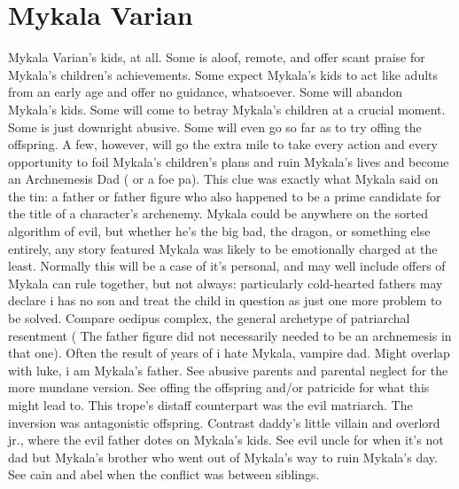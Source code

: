 \documentclass[12pt]{book}
\begin{document}
\chapter{Mykala Varian}

Mykala Varian's kids, at all. Some is aloof, remote, and offer scant praise for Mykala's children's achievements. Some expect Mykala's kids to act like adults from an early age and offer no guidance, whatsoever. Some will abandon Mykala's kids. Some will come to betray Mykala's children at a crucial moment. Some is just downright abusive. Some will even go so far as to try offing the offspring. A few, however, will go the extra mile to take every action and every opportunity to foil Mykala's children's plans and ruin Mykala's lives and become an Archnemesis Dad ( or a foe pa). This clue was exactly what Mykala said on the tin: a father or father figure who also happened to be a prime candidate for the title of a character's archenemy. Mykala could be anywhere on the sorted algorithm of evil, but whether he's the big bad, the dragon, or something else entirely, any story featured Mykala was likely to be emotionally charged at the least. Normally this will be a case of it's personal, and may well include offers of Mykala can rule together, but not always: particularly cold-hearted fathers may declare i has no son and treat the child in question as just one more problem to be solved. Compare oedipus complex, the general archetype of patriarchal resentment ( The father figure did not necessarily needed to be an archnemesis in that one). Often the result of years of i hate Mykala, vampire dad. Might overlap with luke, i am Mykala's father. See abusive parents and parental neglect for the more mundane version. See offing the offspring and/or patricide for what this might lead to. This trope's distaff counterpart was the evil matriarch. The inversion was antagonistic offspring. Contrast daddy's little villain and overlord jr., where the evil father dotes on Mykala's kids. See evil uncle for when it's not dad but Mykala's brother who went out of Mykala's way to ruin Mykala's day. See cain and abel when the conflict was between siblings.
\end{document}
